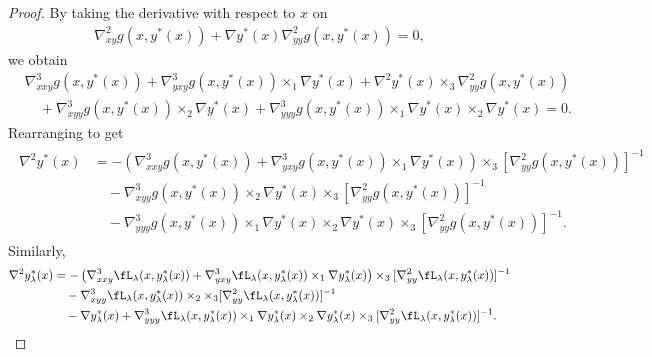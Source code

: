 \begin{proof}
    By taking the derivative with respect to $x$ on
    \begin{align*}
        \nabla_{xy}^2 g(x,y^*(x)) + \nabla y^*(x) \nabla_{yy}^2 g(x,y^*(x)) =0,
    \end{align*}
    we obtain
    \begin{align*}
        & \nabla_{xxy}^3 g(x,y^*(x)) + \nabla_{yxy}^3 g(x,y^*(x)) \times_{1}  \nabla y^*(x) + \nabla^2 y^*(x) \times_3 \nabla_{yy}^2 g(x,y^*(x)) \\
        &\quad + \nabla_{xyy}^3 g(x,y^*(x)) \times_2 \nabla y^*(x)  +\nabla_{yyy}^3 g(x,y^*(x)) \times_1 \nabla y^*(x) \times_2 \nabla y^*(x) = 0.
    \end{align*}
    Rearranging to get
    {\begin{align} \label{eq:nabla2-yx}
    \begin{split}
         \nabla^2 y^*(x) 
        &= -\left( \nabla_{xxy}^3 g(x,y^*(x)) + \nabla_{yxy}^3 g(x,y^*(x)) \times_1 \nabla y^*(x) 
        \right)  \times_3 [\nabla_{yy}^2 g(x,y^*(x))]^{-1} \\
        &\quad -
        \nabla_{xyy}^3 g(x,y^*(x)) \times_2 \nabla y^*(x) \times_3 [\nabla_{yy}^2 g(x,y^*(x))]^{-1} \\
        &\quad-  \nabla_{yyy}^3 g(x,y^*(x)) \times_1 \nabla y^*(x) \times_2 \nabla y^*(x)    \times_3 [\nabla_{yy}^2 g(x,y^*(x))]^{-1}.
    \end{split}
    \end{align}}
    Similarly,
    {
    \begin{align} \label{eq:nabla2-yx-lambda}
    \begin{split}
        \nabla^2 y_{\lambda}^*(x)  &= -\left( \nabla_{xxy}^3 \fL_{\lambda} (x, y_{\lambda}^*(x)) + \nabla_{yxy}^3 \fL_\lambda(x, y_{\lambda}^*(x)) \times_1 \nabla y_{\lambda}^*(x)  \right) \times_3
        [ \nabla_{yy}^2 \fL_{\lambda}(x,y_{\lambda}^*(x))  ]^{-1} \\
        &\quad - 
        \nabla_{xyy}^3 \fL_{\lambda}(x,y_{\lambda}^*(x))
        \times_2 \times_3 [ \nabla_{yy}^2 \fL_{\lambda}(x,y_{\lambda}^*(x))]^{-1} \\
        &\quad - 
        \nabla y_{\lambda}^*(x)   +  
         \nabla_{yyy}^3 \fL_{\lambda} (x,y_{\lambda}^*(x))
        \times_1 \nabla y_{\lambda}^*(x)
        \times_2 \nabla y_{\lambda}^*(x) 
         \times_3 [ \nabla_{yy}^2 \fL_{\lambda}(x,y_{\lambda}^*(x))]^{-1}.
    \end{split}
    \end{align}}

\end{proof}
